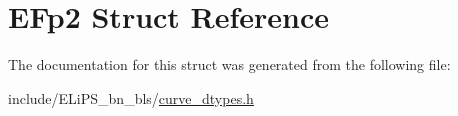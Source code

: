 \hypertarget{struct_e_fp2}{}\section{E\+Fp2 Struct Reference}
\label{struct_e_fp2}


The documentation for this struct was generated from the following file\+:\begin{DoxyCompactItemize}
\item 
include/\+E\+Li\+P\+S\+\_\+bn\+\_\+bls/\hyperlink{curve__dtypes_8h}{curve\+\_\+dtypes.\+h}\end{DoxyCompactItemize}
